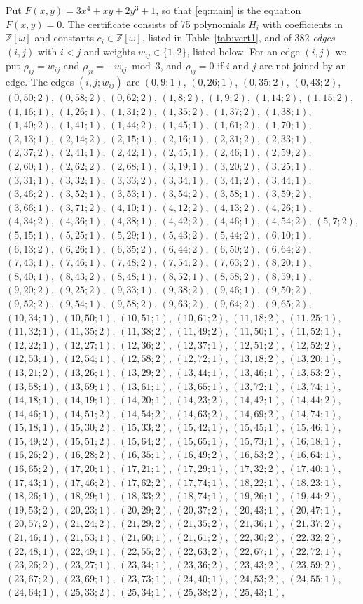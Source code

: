 \documentclass[11pt]{article}
\newcommand{\Z}{\mathbb{Z}}
\begin{document}
Put $F(x,y)=3x^{4}+xy+2y^{3}+1$, so that \eqref{eq:main} is the equation $F(x,y)=0$. The certificate consists of 75 polynomials $H_i$ with coefficients in $\Z[\omega]$ and constants $c_i\in\Z[\omega]$, listed in Table~\ref{tab:vert1}, and of 382 \emph{edges} $(i,j)$ with $i<j$ and weights $w_{ij}\in\{1,2\}$, listed below. For an edge $(i,j)$ we put $\rho_{ij}=w_{ij}$ and $\rho_{ji}=-w_{ij}\bmod 3$, and $\rho_{ij}=0$ if $i$ and $j$ are not joined by an edge.
The edges $(i,j;w_{ij})$ are $(0,9;1)$, $(0,26;1)$, $(0,35;2)$, $(0,43;2)$, $(0,50;2)$, $(0,58;2)$, $(0,62;2)$, $(1,8;2)$, $(1,9;2)$, $(1,14;2)$, $(1,15;2)$, $(1,16;1)$, $(1,26;1)$, $(1,31;2)$, $(1,35;2)$, $(1,37;2)$, $(1,38;1)$, $(1,40;2)$, $(1,41;1)$, $(1,44;2)$, $(1,45;1)$, $(1,61;2)$, $(1,70;1)$, $(2,13;1)$, $(2,14;2)$, $(2,15;1)$, $(2,16;1)$, $(2,31;2)$, $(2,33;1)$, $(2,37;2)$, $(2,41;1)$, $(2,42;1)$, $(2,45;1)$, $(2,46;1)$, $(2,59;2)$, $(2,60;1)$, $(2,62;2)$, $(2,68;1)$, $(3,19;1)$, $(3,20;2)$, $(3,25;1)$, $(3,31;1)$, $(3,32;1)$, $(3,33;2)$, $(3,34;1)$, $(3,41;2)$, $(3,44;1)$, $(3,46;2)$, $(3,52;1)$, $(3,53;1)$, $(3,54;2)$, $(3,58;1)$, $(3,59;2)$, $(3,66;1)$, $(3,71;2)$, $(4,10;1)$, $(4,12;2)$, $(4,13;2)$, $(4,26;1)$, $(4,34;2)$, $(4,36;1)$, $(4,38;1)$, $(4,42;2)$, $(4,46;1)$, $(4,54;2)$, $(5,7;2)$, $(5,15;1)$, $(5,25;1)$, $(5,29;1)$, $(5,43;2)$, $(5,44;2)$, $(6,10;1)$, $(6,13;2)$, $(6,26;1)$, $(6,35;2)$, $(6,44;2)$, $(6,50;2)$, $(6,64;2)$, $(7,43;1)$, $(7,46;1)$, $(7,48;2)$, $(7,54;2)$, $(7,63;2)$, $(8,20;1)$, $(8,40;1)$, $(8,43;2)$, $(8,48;1)$, $(8,52;1)$, $(8,58;2)$, $(8,59;1)$, $(9,20;2)$, $(9,25;2)$, $(9,33;1)$, $(9,38;2)$, $(9,46;1)$, $(9,50;2)$, $(9,52;2)$, $(9,54;1)$, $(9,58;2)$, $(9,63;2)$, $(9,64;2)$, $(9,65;2)$, $(10,34;1)$, $(10,50;1)$, $(10,51;1)$, $(10,61;2)$, $(11,18;2)$, $(11,25;1)$, $(11,32;1)$, $(11,35;2)$, $(11,38;2)$, $(11,49;2)$, $(11,50;1)$, $(11,52;1)$, $(12,22;1)$, $(12,27;1)$, $(12,36;2)$, $(12,37;1)$, $(12,51;2)$, $(12,52;2)$, $(12,53;1)$, $(12,54;1)$, $(12,58;2)$, $(12,72;1)$, $(13,18;2)$, $(13,20;1)$, $(13,21;2)$, $(13,26;1)$, $(13,29;2)$, $(13,44;1)$, $(13,46;1)$, $(13,53;2)$, $(13,58;1)$, $(13,59;1)$, $(13,61;1)$, $(13,65;1)$, $(13,72;1)$, $(13,74;1)$, $(14,18;1)$, $(14,19;1)$, $(14,20;1)$, $(14,23;2)$, $(14,42;1)$, $(14,44;2)$, $(14,46;1)$, $(14,51;2)$, $(14,54;2)$, $(14,63;2)$, $(14,69;2)$, $(14,74;1)$, $(15,18;1)$, $(15,30;2)$, $(15,33;2)$, $(15,42;1)$, $(15,45;1)$, $(15,46;1)$, $(15,49;2)$, $(15,51;2)$, $(15,64;2)$, $(15,65;1)$, $(15,73;1)$, $(16,18;1)$, $(16,26;2)$, $(16,28;2)$, $(16,35;1)$, $(16,49;2)$, $(16,53;2)$, $(16,64;1)$, $(16,65;2)$, $(17,20;1)$, $(17,21;1)$, $(17,29;1)$, $(17,32;2)$, $(17,40;1)$, $(17,43;1)$, $(17,46;2)$, $(17,62;2)$, $(17,74;1)$, $(18,22;1)$, $(18,23;1)$, $(18,26;1)$, $(18,29;1)$, $(18,33;2)$, $(18,74;1)$, $(19,26;1)$, $(19,44;2)$, $(19,53;2)$, $(20,23;1)$, $(20,29;2)$, $(20,37;2)$, $(20,43;1)$, $(20,47;1)$, $(20,57;2)$, $(21,24;2)$, $(21,29;2)$, $(21,35;2)$, $(21,36;1)$, $(21,37;2)$, $(21,46;1)$, $(21,53;1)$, $(21,60;1)$, $(21,61;2)$, $(22,30;2)$, $(22,32;2)$, $(22,48;1)$, $(22,49;1)$, $(22,55;2)$, $(22,63;2)$, $(22,67;1)$, $(22,72;1)$, $(23,26;2)$, $(23,27;1)$, $(23,34;1)$, $(23,36;2)$, $(23,43;2)$, $(23,59;2)$, $(23,67;2)$, $(23,69;1)$, $(23,73;1)$, $(24,40;1)$, $(24,53;2)$, $(24,55;1)$, $(24,64;1)$, $(25,33;2)$, $(25,34;1)$, $(25,38;2)$, $(25,43;1)$, 
\end{document}
